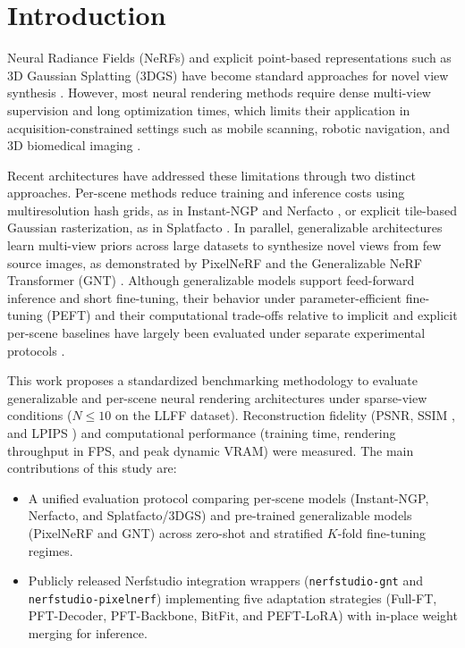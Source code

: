 \section{Introduction}
\label{sec:intro}

Neural Radiance Fields (NeRFs) and explicit point-based representations such as 3D Gaussian Splatting (3DGS) have become standard approaches for novel view synthesis \cite{mildenhall2020nerfrepresentingscenesneural, kerbl3Dgaussians, Tancik2023}. However, most neural rendering methods require dense multi-view supervision and long optimization times, which limits their application in acquisition-constrained settings such as mobile scanning, robotic navigation, and 3D biomedical imaging \cite{ijms24076747, niemeyer2022regnerf}.

Recent architectures have addressed these limitations through two distinct approaches. Per-scene methods reduce training and inference costs using multiresolution hash grids, as in Instant-NGP \cite{muller2022} and Nerfacto \cite{Tancik2023}, or explicit tile-based Gaussian rasterization, as in Splatfacto \cite{kerbl3Dgaussians}. In parallel, generalizable architectures learn multi-view priors across large datasets to synthesize novel views from few source images, as demonstrated by PixelNeRF \cite{yu2021pixelnerfneuralradiancefields} and the Generalizable NeRF Transformer (GNT) \cite{t2023attentionnerfneeds}. Although generalizable models support feed-forward inference and short fine-tuning, their behavior under parameter-efficient fine-tuning (PEFT) and their computational trade-offs relative to implicit and explicit per-scene baselines have largely been evaluated under separate experimental protocols \cite{kulhanek2025nerfbaselinesconsistentreproducibleevaluation}.

This work proposes a standardized benchmarking methodology to evaluate generalizable and per-scene neural rendering architectures under sparse-view conditions ($N \le 10$ on the LLFF dataset). Reconstruction fidelity (PSNR, SSIM \cite{wang2004image}, and LPIPS \cite{zhang2018unreasonable}) and computational performance (training time, rendering throughput in FPS, and peak dynamic VRAM) were measured. The main contributions of this study are:
\begin{itemize}\setlength{\itemsep}{1pt}\setlength{\parskip}{0pt}
\item A unified evaluation protocol comparing per-scene models (Instant-NGP, Nerfacto, and Splatfacto/3DGS) and pre-trained generalizable models (PixelNeRF and GNT) across zero-shot and stratified $K$-fold fine-tuning regimes.
\item Publicly released Nerfstudio integration wrappers (\texttt{nerfstudio-gnt} and \texttt{nerfstudio-pixelnerf}) implementing five adaptation strategies (Full-FT, PFT-Decoder, PFT-Backbone, BitFit, and PEFT-LoRA) with in-place weight merging for inference.
\end{itemize}
